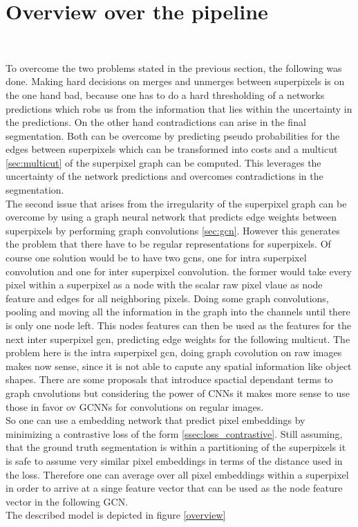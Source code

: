 \section{Overview over the pipeline}~\label{seg:ov_pip}

To overcome the two problems stated in the previous section, the following was done. Making hard decisions on merges and unmerges between superpixels is on the one hand bad, because one has to do a hard thresholding of a networks predictions which robs us from the information that lies within the uncertainty in the predictions. On the other hand contradictions can arise in the final segmentation. Both can be overcome by predicting pseudo probabilities for the edges between superpixels which can be transformed into costs and a multicut \ref{sec:multicut} of the superpixel graph can be computed. This leverages the uncertainty of the network predictions and overcomes contradictions in the segmentation. \\
The second issue that arises from the irregularity of the superpixel graph can be overcome by using a graph neural network that predicts edge weights between superpixels by performing graph convolutions \ref{sec:gcn}. However this generates the problem that there have to be regular representations for superpixels. Of course one solution would be to have two gcns, one for intra superpixel convolution and one for inter superpixel convolution. the former would take every pixel within a superpixel as a node with the scalar raw pixel vlaue as node feature and edges for all neighboring pixels. Doing some graph convolutions, pooling and moving all the information in the graph into the channels until there is only one node left. This nodes features can then be used as the features for the next inter superpixel gcn, predicting edge weights for the following multicut. The problem here is the intra superpixel gcn, doing graph covolution on raw images makes now sense, since it is not able to capute any spatial information like object shapes. There are some proposals \cite{monti2016geometric} that introduce spactial dependant terms to graph cnvolutions but considering the power of CNNs it makes more sense to use those in favor ov GCNNs for convolutions on regular images.\\
So one can use a embedding network that predict pixel embeddings by minimizing a contrastive loss of the form \ref{ssec:loss_contrastive}. Still assuming, that the ground truth segmentation is within a partitioning of the superpixels it is safe to assume very similar pixel embeddings in terms of the distance used in the loss. Therefore one can average over all pixel embeddings within a superpixel in order to arrive at a singe feature vector that can be used as the node feature vector in the following GCN.\\
The described model is depicted in figure \ref{overview}



